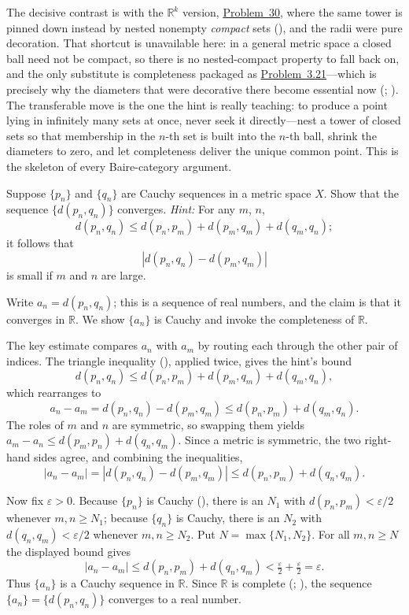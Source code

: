 \documentclass[main.tex]{subfiles}
\begin{document}
\begin{Reflection}
The decisive contrast is with the $\mathbb R^k$ version, \hyperlink{prob:30}{Problem~30}, where the same
tower is pinned down instead by nested nonempty \emph{compact} sets
(), and the radii were pure decoration. That shortcut is
unavailable here: in a general metric space a closed ball need not be compact, so there is no
nested-compact property to fall back on, and the only substitute is completeness packaged as
\hyperlink{prob:3.21}{Problem~3.21}---which is precisely why the diameters that were decorative there
become essential now (; ). The transferable move is the
one the hint is really teaching: to produce a point lying in infinitely many sets at once, never seek it
directly---nest a tower of closed sets so that membership in the $n$-th set is built into the $n$-th ball,
shrink the diameters to zero, and let completeness deliver the unique common point. This is the skeleton
of every Baire-category argument.
\end{Reflection}

Suppose $\{p_{n}\}$ and $\{q_{n}\}$ are Cauchy sequences in a metric space $X$. Show that the sequence $\{d(p_{n}, q_{n})\}$ converges. \textit{Hint:} For any $m$, $n$,
\[
d(p_{n}, q_{n}) \leq d(p_{n}, p_{m}) + d(p_{m}, q_{m}) + d(q_{m}, q_{n});
\]
it follows that
\[
|d(p_{n}, q_{n}) - d(p_{m}, q_{m})|
\]
is small if $m$ and $n$ are large.

\begin{Solution}
Write $a_{n}=d(p_{n},q_{n})$; this is a sequence of real numbers, and the claim is that it converges in
$\mathbb R$. We show $\{a_{n}\}$ is Cauchy and invoke the completeness of $\mathbb R$.

The key estimate compares $a_{n}$ with $a_{m}$ by routing each through the other pair of indices. The
triangle inequality (), applied twice, gives the hint's bound
\[
d(p_{n},q_{n})\le d(p_{n},p_{m})+d(p_{m},q_{m})+d(q_{m},q_{n}),
\]
which rearranges to
\[
a_{n}-a_{m}=d(p_{n},q_{n})-d(p_{m},q_{m})\le d(p_{n},p_{m})+d(q_{m},q_{n}).
\]
The roles of $m$ and $n$ are symmetric, so swapping them yields
$a_{m}-a_{n}\le d(p_{m},p_{n})+d(q_{n},q_{m})$. Since a metric is symmetric, the two right-hand sides
agree, and combining the inequalities,
\[
|a_{n}-a_{m}|=|d(p_{n},q_{n})-d(p_{m},q_{m})|\le d(p_{n},p_{m})+d(q_{n},q_{m}).
\]

Now fix $\varepsilon>0$. Because $\{p_{n}\}$ is Cauchy (), there is an $N_{1}$ with
$d(p_{n},p_{m})<\varepsilon/2$ whenever $m,n\ge N_{1}$; because $\{q_{n}\}$ is Cauchy, there is an
$N_{2}$ with $d(q_{n},q_{m})<\varepsilon/2$ whenever $m,n\ge N_{2}$. Put $N=\max\{N_{1},N_{2}\}$. For
all $m,n\ge N$ the displayed bound gives
\[
|a_{n}-a_{m}|\le d(p_{n},p_{m})+d(q_{n},q_{m})<\tfrac{\varepsilon}{2}+\tfrac{\varepsilon}{2}=\varepsilon.
\]
Thus $\{a_{n}\}$ is a Cauchy sequence in $\mathbb R$. Since $\mathbb R$ is complete
(; ), the sequence
$\{a_{n}\}=\{d(p_{n},q_{n})\}$ converges to a real number.
\end{Solution}
\end{document}
